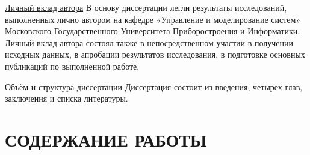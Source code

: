 \underline{Личный вклад автора}
В основу диссертации легли результаты исследований, выполненных лично автором на кафедре «Управление и моделирование систем» Московского Государственного
Университета Приборостроения и Информатики. Личный вклад автора состоял также в непосредственном участии в получении исходных данных, в апробации результатов исследования,
в подготовке основных публикаций по выполненной работе.

\underline{Объём и структура диссертации}
Диссертация состоит из введения, четырех глав, заключения и списка литературы.

\section*{СОДЕРЖАНИЕ РАБОТЫ}










